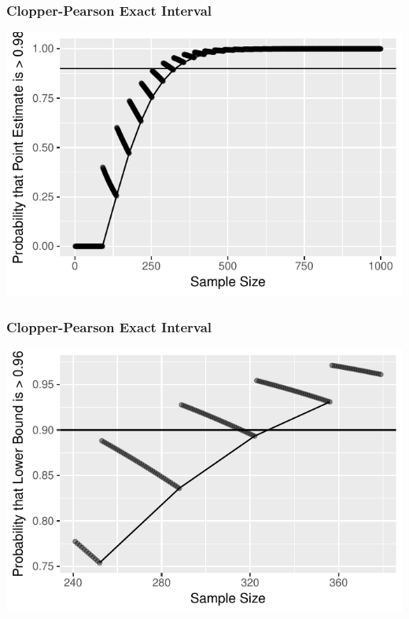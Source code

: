 \documentclass{beamer}\usepackage{knitr}
\begin{document}
\begin{frame}
\frametitle{Clopper-Pearson Exact Interval}
\begin{knitrout}
\color{fgcolor}

{\centering \includegraphics[width=\linewidth]{figure/plot_Exact_2-1} 

}



\end{knitrout}
\end{frame}

\begin{frame}
\frametitle{Clopper-Pearson Exact Interval}
\begin{knitrout}
\color{fgcolor}

{\centering \includegraphics[width=\linewidth]{figure/plot_Exact_3-1} 

}



\end{knitrout}
\end{frame}
\end{document}
